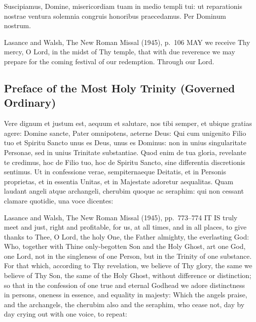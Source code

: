 \begin{latinproper}
Suscipiamus, Domine, misericordiam tuam in medio templi tui: ut reparationis nostrae ventura solemnia congruis honoribus praecedamus. Per Dominum nostrum.
\end{latinproper}

\begin{englishwitness}{Lasance and Walsh, The New Roman Missal (1945), p.~106}
MAY we receive Thy mercy, O Lord, in the midst of Thy temple, that with due reverence we may prepare for the coming festival of our redemption. Through our Lord.
\end{englishwitness}

\subsection{Preface of the Most Holy Trinity (Governed Ordinary)}

\begin{latinproper}
Vere dignum et justum est, aequum et salutare, nos tibi semper, et ubique gratias agere: Domine sancte, Pater omnipotens, aeterne Deus: Qui cum unigenito Filio tuo et Spiritu Sancto unus es Deus, unus es Dominus: non in unius singularitate Personae, sed in unius Trinitate substantiae. Quod enim de tua gloria, revelante te credimus, hoc de Filio tuo, hoc de Spiritu Sancto, sine differentia discretionis sentimus. Ut in confessione verae, sempiternaeque Deitatis, et in Personis proprietas, et in essentia Unitas, et in Majestate adoretur aequalitas. Quam laudant angeli atque archangeli, cherubim quoque ac seraphim: qui non cessant clamare quotidie, una voce dicentes:
\end{latinproper}

\begin{englishwitness}{Lasance and Walsh, The New Roman Missal (1945), pp.~773--774}
IT IS truly meet and just, right and profitable, for us, at all times, and in all places, to give thanks to Thee, O Lord, the holy One, the Father almighty, the everlasting God: Who, together with Thine only-begotten Son and the Holy Ghost, art one God, one Lord, not in the singleness of one Person, but in the Trinity of one substance. For that which, according to Thy revelation, we believe of Thy glory, the same we believe of Thy Son, the same of the Holy Ghost, without difference or distinction; so that in the confession of one true and eternal Godhead we adore distinctness in persons, oneness in essence, and equality in majesty: Which the angels praise, and the archangels, the cherubim also and the seraphim, who cease not, day by day crying out with one voice, to repeat:
\end{englishwitness}
